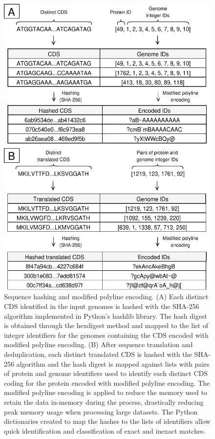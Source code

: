 \newpage
\begin{figure}[h!]
    \centering
    \includegraphics[angle=0,width=\textwidth]{figures/chapter 2/FigureS7.pdf}
    \caption{Sequence hashing and modified polyline encoding. (A) Each distinct CDS identified in the input genomes is hashed with the SHA-256 algorithm implemented in Python's hashlib library. The hash digest is obtained through the hexdigest method and mapped to the list of integer identifiers for the genomes containing the CDS encoded with modified polyline encoding. (B) After sequence translation and deduplication, each distinct translated CDS is hashed with the SHA-256 algorithm and the hash digest is mapped against lists with pairs of protein and genome identifiers used to identify each distinct CDS coding for the protein encoded with modified polyline encoding. The modified polyline encoding is applied to reduce the memory used to retain the data in-memory during the process, drastically reducing peak memory usage when processing large datasets. The Python dictionaries created to map the hashes to the lists of identifiers allow quick identification and classification of exact and inexact matches.}
    \label{fig:chap2_figureS7}
\end{figure}


